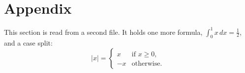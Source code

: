 \section{Appendix}\label{sec:appendix}

This section is read from a second file. It holds one more formula,
$\int_0^1 x\,dx = \tfrac12$, and a case split:
\[
  |x| = \begin{cases} x & \text{if } x \ge 0, \\ -x & \text{otherwise.} \end{cases}
\]
